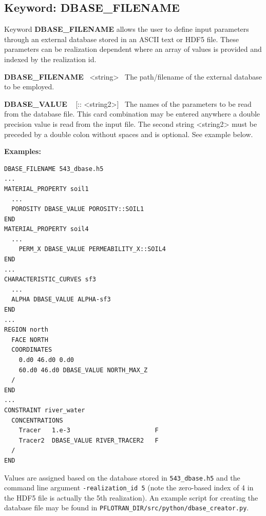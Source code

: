 
\newpage
\protect\hypertarget{target_dbase}{}

\subsection{Keyword: DBASE\_FILENAME}

\hfill\hyperlink{target_key}{\return}

Keyword {\bf DBASE\_FILENAME} allows the user to define input parameters through an external database stored in an ASCII text or HDF5 file. These parameters can be realization dependent where an array of values is provided and indexed by the realization id.

{\bf DBASE\_FILENAME} \ <string> \ 
The path/filename of the external database to be employed.

{\bf DBASE\_VALUE} \ <string1> [:: <string2>] \ 
The names of the parameters to be read from the database file. This card combination may be entered anywhere a double precision value is read from the input file. The second string <string2> must be preceded by a double colon without spaces and is optional. See example below.

\begin{mdframed}

{\noindent\bf Examples:}
\footnotesize
\begin{verbatim}
DBASE_FILENAME 543_dbase.h5
...
MATERIAL_PROPERTY soil1
  ...
  POROSITY DBASE_VALUE POROSITY::SOIL1
END
MATERIAL_PROPERTY soil4
  ...
    PERM_X DBASE_VALUE PERMEABILITY_X::SOIL4
END
...
CHARACTERISTIC_CURVES sf3
  ...
  ALPHA DBASE_VALUE ALPHA-sf3
END
...
REGION north
  FACE NORTH
  COORDINATES
    0.d0 46.d0 0.d0
    60.d0 46.d0 DBASE_VALUE NORTH_MAX_Z
  /
END
...
CONSTRAINT river_water
  CONCENTRATIONS
    Tracer   1.e-3                       F
    Tracer2  DBASE_VALUE RIVER_TRACER2   F
  /
END
\end{verbatim}
\normalsize
Values are assigned based on the database stored in {\tt 543\_dbase.h5} and the command line argument {\tt -realization\_id 5} (note the zero-based index of 4 in the HDF5 file is actually the 5th realization). An example script for creating the database file may be found in {\tt PFLOTRAN\_DIR/src/python/dbase\_creator.py}.
\end{mdframed}

